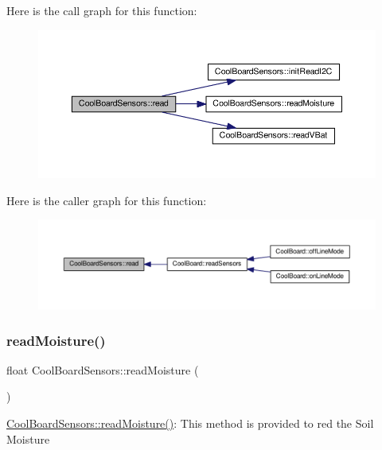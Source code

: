 Here is the call graph for this function\+:
\nopagebreak
\begin{figure}[H]
\begin{center}
\leavevmode
\includegraphics[width=350pt]{class_cool_board_sensors_a91badb2539d91fda8679f2a597874c48_cgraph}
\end{center}
\end{figure}
Here is the caller graph for this function\+:
\nopagebreak
\begin{figure}[H]
\begin{center}
\leavevmode
\includegraphics[width=350pt]{class_cool_board_sensors_a91badb2539d91fda8679f2a597874c48_icgraph}
\end{center}
\end{figure}
\mbox{\label{class_cool_board_sensors_a8761bff50373c485f4465c8db47d0633}} 
\subsubsection{\texorpdfstring{read\+Moisture()}{readMoisture()}}
{\footnotesize\ttfamily float Cool\+Board\+Sensors\+::read\+Moisture (\begin{DoxyParamCaption}{ }\end{DoxyParamCaption})}

\hyperlink{class_cool_board_sensors_a8761bff50373c485f4465c8db47d0633}{Cool\+Board\+Sensors\+::read\+Moisture()}\+: This method is provided to red the Soil Moisture

